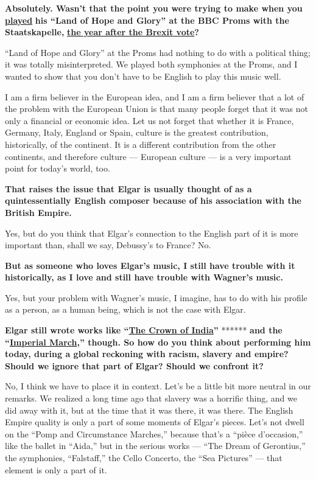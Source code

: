 \textbf{Absolutely. Wasn't that the point you were trying to make when
you} \textbf{\href{https://www.bbc.co.uk/programmes/p058y4np}{played}}
\textbf{his ``Land of Hope and Glory'' at the BBC Proms with the
Staatskapelle,}
\textbf{\href{https://www.theguardian.com/music/2017/jul/17/daniel-barenboim-calls-for-european-unity-in-proms-speech}{the
year after the Brexit vote}?}

``Land of Hope and Glory'' at the Proms had nothing to do with a
political thing; it was totally misinterpreted. We played both
symphonies at the Proms, and I wanted to show that you don't have to be
English to play this music well.

I am a firm believer in the European idea, and I am a firm believer that
a lot of the problem with the European Union is that many people forget
that it was not only a financial or economic idea. Let us not forget
that whether it is France, Germany, Italy, England or Spain, culture is
the greatest contribution, historically, of the continent. It is a
different contribution from the other continents, and therefore culture
--- European culture --- is a very important point for today's world,
too.

\textbf{That raises the issue that Elgar is usually thought of as a
quintessentially English composer because of his association with the
British Empire.}

Yes, but do you think that Elgar's connection to the English part of it
is more important than, shall we say, Debussy's to France? No.

\textbf{But as someone who loves Elgar's music, I still have trouble
with it historically, as I love and still have trouble with Wagner's
music.}

Yes, but your problem with Wagner's music, I imagine, has to do with his
profile as a person, as a human being, which is not the case with Elgar.

\textbf{Elgar still wrote works like
``\href{https://www.youtube.com/watch?v=ah2cG8cjD7A}{The Crown of
India}''} ****** \textbf{and the
``\href{https://www.youtube.com/watch?v=zik9vQsti5k}{Imperial March},''
though. So how do you think about performing him today, during a global
reckoning with racism, slavery and empire? Should we ignore that part of
Elgar? Should we confront it?}

No, I think we have to place it in context. Let's be a little bit more
neutral in our remarks. We realized a long time ago that slavery was a
horrific thing, and we did away with it, but at the time that it was
there, it was there. The English Empire quality is only a part of some
moments of Elgar's pieces. Let's not dwell on the ``Pomp and
Circumstance Marches,'' because that's a ``pièce d'occasion,'' like the
ballet in ``Aida,'' but in the serious works --- ``The Dream of
Gerontius,'' the symphonies, ``Falstaff,'' the Cello Concerto, the ``Sea
Pictures'' --- that element is only a part of it.

